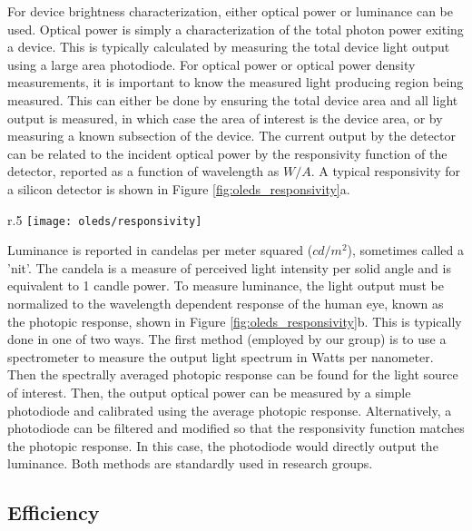 \documentclass[../thesis.tex]{subfiles}
\begin{document}
For device brightness characterization, either optical power or luminance can be used.
Optical power is simply a characterization of the total photon power exiting a device.
This is typically calculated by measuring the total device light output using a large area photodiode.
For optical power or optical power density measurements, it is important to know the measured light producing region being measured.
This can either be done by ensuring the total device area and all light output is measured, in which case the area of interest is the device area, or by measuring a known subsection of the device.
The current output by the detector can be related to the incident optical power by the responsivity function of the detector, reported as a function of wavelength as $W/A$.
A typical responsivity for a silicon detector is shown in Figure \ref{fig:oleds_responsivity}a.

\begin{wrapfigure}{r}{.5\textwidth}
    \centering
    \texttt{[image: oleds/responsivity]}
\caption{a. Silicon detector responsivity b. Photopic response}
\label{fig:oleds_responsivity}
\end{wrapfigure}


Luminance is reported in candelas per meter squared ($cd/m^2$), sometimes called a 'nit'.
The candela is a measure of perceived light intensity per solid angle and is equivalent to 1 candle power.
To measure luminance, the light output must be normalized to the wavelength dependent response of the human eye, known as the photopic response, shown in Figure \ref{fig:oleds_responsivity}b.
This is typically done in one of two ways.
The first method (employed by our group) is to use a spectrometer to measure the output light spectrum in Watts per nanometer.  
Then the spectrally averaged photopic response can be found for the light source of interest.
Then, the output optical power can be measured by a simple photodiode and calibrated using the average photopic response.
Alternatively, a photodiode can be filtered and modified so that the responsivity function matches the photopic response.
In this case, the photodiode would directly output the luminance.
Both methods are standardly used in research groups.\supercite{Hershey2016,Inoue2016,Forrest2003}


\subsection{Efficiency}\label{sec:efficiency_analysis}
\end{document}
